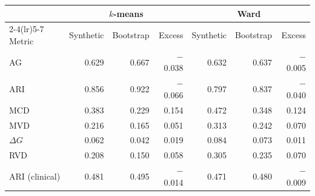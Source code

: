 \begin{tabular}{lrrrrrr}
\toprule
 & \multicolumn{3}{c}{$k$-means} & \multicolumn{3}{c}{Ward} \\
\cmidrule(lr){2-4}\cmidrule(lr){5-7}
Metric & Synthetic & Bootstrap & Excess & Synthetic & Bootstrap & Excess \\
\midrule
AG & 0.629 & 0.667 & $-$0.038 & 0.632 & 0.637 & $-$0.005 \\
ARI & 0.856 & 0.922 & $-$0.066 & 0.797 & 0.837 & $-$0.040 \\
\addlinespace
MCD & 0.383 & 0.229 & 0.154 & 0.472 & 0.348 & 0.124 \\
MVD & 0.216 & 0.165 & 0.051 & 0.313 & 0.242 & 0.070 \\
$\Delta G$ & 0.062 & 0.042 & 0.019 & 0.084 & 0.073 & 0.011 \\
RVD & 0.208 & 0.150 & 0.058 & 0.305 & 0.235 & 0.070 \\
\addlinespace
ARI (clinical) & 0.481 & 0.495 & $-$0.014 & 0.471 & 0.480 & $-$0.009 \\
\bottomrule
\end{tabular}
